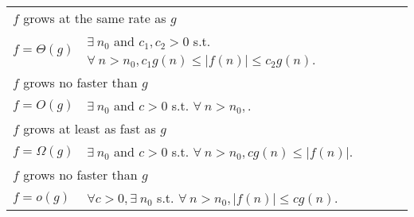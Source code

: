 \begin{tabular}{l l}
  \hline \multicolumn{2}{l}{$f$ grows at the same rate as $g$} \\
  $f = \Theta(g)$ 
  & $\exists \ n_0$ and $c_1, c_2 > 0$ s.t. $\forall \ n > n_0, c_1 g(n) \leq |f(n)| \leq c_2 g(n)$. \\
  \hline \multicolumn{2}{l}{$f$ grows no faster than $g$} \\
  $f = O(g)$ 
  & $\exists \ n_0$ and $c > 0$ s.t. $\forall \ n > n_0, $. \\
  \hline \multicolumn{2}{l}{$f$ grows at least as fast as $g$} \\
  $f = \Omega(g)$ 
  & $\exists \ n_0$ and $c > 0$ s.t. $\forall \ n > n_0, c g(n) \leq |f(n)|$. \\
  \hline \multicolumn{2}{l}{$f$ grows no faster than $g$} \\
  $f = o(g)$ 
  & $\forall c>0, \exists \ n_0$ s.t. $\forall \ n > n_0, |f(n)| \leq c g(n)$. \\
  \hline
\end{tabular}

